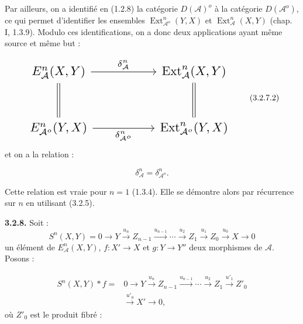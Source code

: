 \clearpage
{}%
\begingroup\small\setlength{\parskip}{0pt}\setlength{\emergencystretch}{1.5em}
\setlength{\abovedisplayskip}{4pt plus 2pt minus 2pt}%
\setlength{\belowdisplayskip}{4pt plus 2pt minus 2pt}%

Par ailleurs, on a identifié en (1.2.8) la catégorie $D(\mathcal A)^o$ à
la catégorie $D(\mathcal A^o)$, ce qui permet d'identifier les ensembles
$\operatorname{Ext}_{\mathcal A^o}^{n}(Y,X)$ et
$\operatorname{Ext}_{\mathcal A}^{n}(X,Y)$ (chap. I, 1.3.9). Modulo ces
identifications, on a donc deux applications ayant même source et même but :

\begin{equation}
\resizebox{0.74\textwidth}{!}{%
$\begin{tikzcd}[ampersand replacement=\&,column sep=5.0em,row sep=2.8em]
E_{\mathcal A}^{n}(X,Y)
  \arrow[r,"{\delta_{\mathcal A}^{n}}"]
  \arrow[d,equal]
\& \operatorname{Ext}_{\mathcal A}^{n}(X,Y)
  \arrow[d,equal] \\
E_{\mathcal A^o}^{n}(Y,X)
  \arrow[r,"{\delta_{\mathcal A^o}^{n}}"']
\& \operatorname{Ext}_{\mathcal A^o}^{n}(Y,X)
\end{tikzcd}$%
}
\tag{3.2.7.2}
\end{equation}
et on a la relation :

\begin{equation}
\delta_{\mathcal A}^{n}=\delta_{\mathcal A^o}^{n}.
\tag{3.2.7.3}
\end{equation}

Cette relation est vraie pour $n=1$ (1.3.4). Elle se démontre alors par
récurrence sur $n$ en utilisant (3.2.5).

\medskip\noindent\textbf{3.2.8.}\quad
Soit :
\[
S^n(X,Y)=0\longrightarrow Y\xrightarrow{u_n}Z_{n-1}
\xrightarrow{u_{n-1}}\cdots\xrightarrow{u_2}Z_1
\xrightarrow{u_1}Z_0\xrightarrow{u_0}X\longrightarrow0
\]
un élément de $E_{\mathcal A}^{n}(X,Y)$,
$f\colon X'\longrightarrow X$ et $g\colon Y\longrightarrow Y''$ deux
morphismes de $\mathcal A$. Posons :

\begin{equation}
\begin{aligned}
S^n(X,Y)*f={}&0\longrightarrow Y\xrightarrow{u_n}Z_{n-1}
\xrightarrow{u_{n-1}}\cdots\xrightarrow{u_2}Z_1
\xrightarrow{u'_1}Z'_0\\
&\xrightarrow{u'_0}X'\longrightarrow0,
\end{aligned}
\tag{3.2.8.1}
\end{equation}
où $Z'_0$ est le produit fibré :

